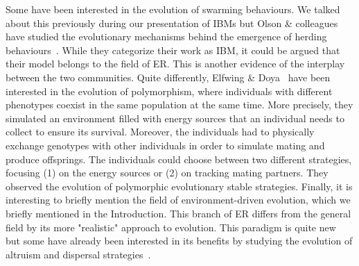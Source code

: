         Some have been interested in the evolution of swarming behaviours. We talked about this previously during our presentation of IBMs but Olson \& colleagues have studied the evolutionary mechanisms behind the emergence of herding behaviours~\parencite{Olson2013, Olson2013a, Haley2014}. While they categorize their work as IBM, it could be argued that their model belongs to the field of ER. This is another evidence of the interplay between the two communities. Quite differently, Elfwing \& Doya~\parencite{Elfwing2014a} have been interested in the evolution of polymorphism, where individuals with different phenotypes coexist in the same population at the same time. More precisely, they simulated an environment filled with energy sources that an individual needs to collect to ensure its survival. Moreover, the individuals had to physically exchange genotypes with other individuals in order to simulate mating and produce offsprings. The individuals could choose between two different strategies, focusing (1) on the energy sources or (2) on tracking mating partners. They observed the evolution of polymorphic evolutionary stable strategies. Finally, it is interesting to briefly mention the field of environment-driven evolution, which we briefly mentioned in the Introduction. This branch of ER differs from the general field by its more "realistic" approach to evolution. This paradigm is quite new~\parencite{Bredeche2010, Bredeche2012} but some have already been interested in its benefits by studying the evolution of altruism and dispersal strategies~\parencite{Montanier2011, Montanier2013}.


